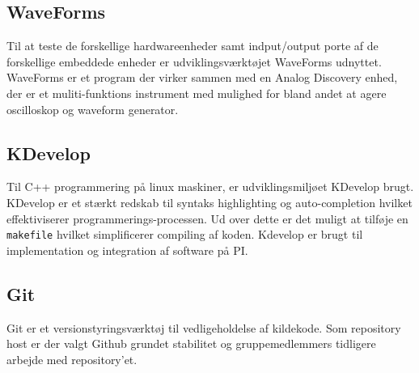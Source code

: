 \subsection*{WaveForms}
Til at teste de forskellige hardwareenheder samt indput/output porte af de forskellige embeddede enheder er udviklingsværktøjet WaveForms udnyttet. WaveForms er et program der virker sammen med en Analog Discovery enhed, der er et muliti-funktions instrument med mulighed for bland andet at agere oscilloskop og waveform generator. 

\subsection*{KDevelop}
Til C++ programmering på linux maskiner, er udviklingsmiljøet KDevelop brugt. KDevelop er et stærkt redskab til syntaks highlighting og auto-completion hvilket effektiviserer programmerings-processen. Ud over dette er det muligt at tilføje en \texttt{makefile} hvilket simplificerer compiling af koden. Kdevelop er brugt til implementation og integration af software på PI.

\subsection*{Git}
Git er et versionstyringsværktøj til vedligeholdelse af kildekode. Som repository host er der valgt Github grundet stabilitet og gruppemedlemmers tidligere arbejde med repository'et.

\clearpage